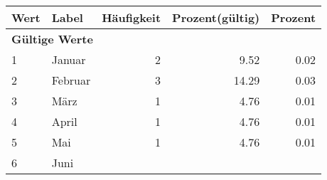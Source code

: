     \begin{longtable}{lXrrr}
     \toprule
     \textbf{Wert} & \textbf{Label} & \textbf{Häufigkeit} & \textbf{Prozent(gültig)} & \textbf{Prozent} \\
     \endhead
     \midrule
     \multicolumn{5}{l}{\textbf{Gültige Werte}}\\

     1 &
     \multicolumn{1}{X}{ Januar   } &


       \num{2} &
       \num[round-mode=places,round-precision=2]{9,52} &
         \num[round-mode=places,round-precision=2]{0,02} \\

     2 &
     \multicolumn{1}{X}{ Februar   } &


       \num{3} &
       \num[round-mode=places,round-precision=2]{14,29} &
         \num[round-mode=places,round-precision=2]{0,03} \\

     3 &
     \multicolumn{1}{X}{ März   } &


       \num{1} &
       \num[round-mode=places,round-precision=2]{4,76} &
         \num[round-mode=places,round-precision=2]{0,01} \\

     4 &
     \multicolumn{1}{X}{ April   } &


       \num{1} &
       \num[round-mode=places,round-precision=2]{4,76} &
         \num[round-mode=places,round-precision=2]{0,01} \\

     5 &
     \multicolumn{1}{X}{ Mai   } &


       \num{1} &
       \num[round-mode=places,round-precision=2]{4,76} &
         \num[round-mode=places,round-precision=2]{0,01} \\

     6 &
     \multicolumn{1}{X}{ Juni   } &



\end{longtable}
